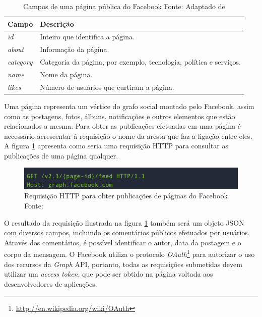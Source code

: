 \begin{table}[!ht]
\begin{center}
  \begin{tabular}{|p{5cm}|p{7cm}|}
	\hline
	Campo & Descrição
	\\ \hline
	\textit{id} &  Inteiro que identifica a página.
	\\ \hline
	\textit{about} & Informação da página.
	\\ \hline
	\textit{category} & Categoria da página, por exemplo, tecnologia, política e serviços.
	\\ \hline
	\textit{name} & Nome da página.
	\\ \hline
	\textit{likes} & Número de usuários que curtiram a página.
	\\ \hline
  \end{tabular}
  \captionsetup{justification=centering}
  \caption[Campos de uma página pública do Facebook]{Campos de uma página pública do Facebook
  \protect\linebreak Fonte: Adaptado de \cite{facebook-page-doc}}
\label{tab-fb-campos}
\end{center}
\end{table}
\FloatBarrier

Uma página representa um vértice do grafo social montado pelo Facebook, assim como as postagens, fotos, álbuns, notificações e outros elementos que estão relacionados a mesma. Para obter as publicações efetuadas em uma página é necessário acrescentar à requisição o nome da aresta que faz a ligação entre eles. A figura \ref{facebook-rest} apresenta como seria uma requisição HTTP para consultar as publicações de uma página qualquer.

\begin{figure}[ht!]
	\centering
	\includegraphics[keepaspectratio=true,scale=0.35]
	  {figuras/fb-http.eps}
	\caption[Requisição HTTP para obter publicações de páginas do Facebook]{Requisição HTTP para obter publicações de páginas do Facebook
	\protect\linebreak Fonte: \cite{facebook-page-doc}}
	\label{facebook-rest}
\end{figure}
\FloatBarrier

O resultado da requisição ilustrada na figura \ref{facebook-rest} também será um objeto JSON com diversos campos, incluindo os comentários públicos efetuados por usuários. Através dos comentários, é possível identificar o autor, data da postagem e o corpo da mensagem. O Facebook utiliza o protocolo \textit{OAuth}\footnote{\url{http://en.wikipedia.org/wiki/OAuth}} para autorizar o uso dos recursos da \textit{Graph} API, portanto, todas as requisições submetidas devem utilizar um \textit{access token}, que pode ser obtido na página voltada aos desenvolvedores de aplicações.

